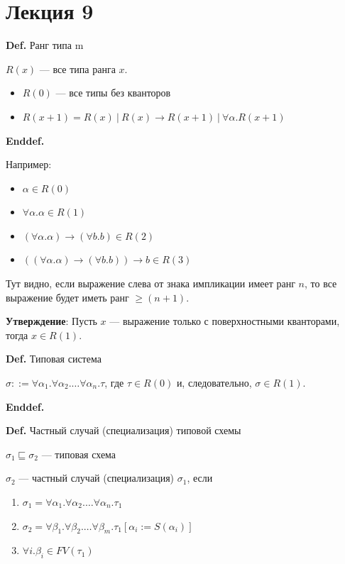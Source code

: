 \section{Лекция 9}

\noindent\textbf{Def.} Ранг типа  m 

$R(x)$ --- все типа ранга $x$.
\begin{itemize}
    \item $R(0)$ --- все типы без кванторов
    \item $R(x + 1) = R(x)\ |\ R(x) \rightarrow R(x + 1)\ |\ \forall \alpha.R(x + 1)$
\end{itemize}
\noindent\textbf{Enddef.} 

Например:
\begin{paracol}{2}
\begin{itemize}
    \item $\alpha \in R(0)$
    \item $\forall \alpha.\alpha \in R(1)$
    \item $(\forall \alpha.\alpha) \rightarrow (\forall b.b) \in R(2)$ 
    \item $((\forall \alpha.\alpha) \rightarrow (\forall b.b)) \rightarrow b \in R(3)$
\end{itemize}
\switchcolumn
Тут видно, если выражение слева от знака импликации имеет ранг $n$, то все выражение будет иметь ранг $\geq (n + 1)$.
\end{paracol}

\textbf{Утверждение}: Пусть $x$ --- выражение только с поверхностными кванторами, тогда $x \in R(1)$. 

\noindent\textbf{Def.} Типовая система

$\sigma ::= \forall \alpha_1. \forall \alpha_2. \dots \forall \alpha_n. \tau$, где $\tau \in R(0)$ и, следовательно, $\sigma \in R(1)$.

\noindent\textbf{Enddef.} 

\noindent\textbf{Def.} Частный случай (специализация) типовой схемы

$\sigma_1 \sqsubseteq \sigma_2$ --- типовая схема

$\sigma_2$ --- частный случай (специализация) $\sigma_1$, если 

\begin{enumerate}
    \item $\sigma_1 =  \forall \alpha_1. \forall \alpha_2. \dots \forall \alpha_n. \tau_1$
    \item $\sigma_2 =  \forall \beta_1. \forall \beta_2. \dots \forall \beta_m. \tau_1[\alpha_i := S(\alpha_i)]$
    \item $\forall i. \beta_i \in FV(\tau_1)$
\end{enumerate}

